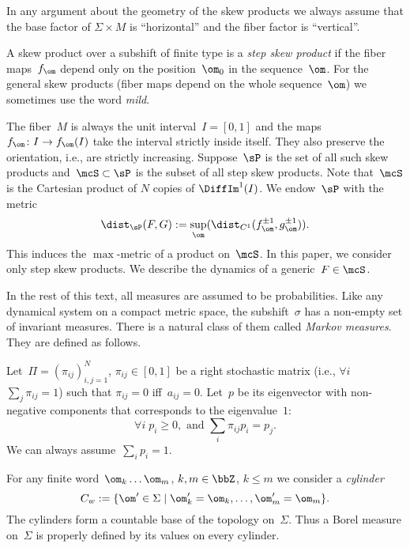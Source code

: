 \documentclass[a4paper,12pt]{amsart}
\begin{document}
In any argument about the geometry of the skew products we always assume that the base factor of $\Sigma \times M$ is ``horizontal'' and the fiber factor is ``vertical''.

\begin{Def} \label{d:step_and_mild}
A skew product over a subshift of finite type is a \emph{step skew product} if the fiber maps~$f_{\om}$ depend only on the position~$\om_0$ in the sequence~$\om$. For the general skew products (fiber maps depend on the whole sequence~$\om$) we sometimes use the word \emph{mild}.
\end{Def}

The fiber~$M$ is always the unit interval~$I = [0,1]$ and the maps $f_\om \colon I \to f_\om(I)$
take the interval strictly inside itself. They also preserve the orientation, i.e., are strictly increasing. Suppose~$\sP$ is the set of all such skew products and~$\mcS \subset \sP$ is the subset of all step skew products. Note that~$\mcS$ is the Cartesian product of $N$ copies of $\DiffIm^1(I)$. We endow~$\sP$ with the metric
$$
\dist_\sP (F,G) := \sup_\om (\dist_{C^1} (f_\om^{\pm 1}, g_\om^{\pm 1})).
$$
This induces the $\max$-metric of a product on~$\mcS$.
In this paper, we consider only step skew products. We describe the dynamics of a generic~$F \in \mcS$.

In the rest of this text, all measures are assumed to be probabilities.
Like any dynamical system on a compact metric space, the subshift~$\sigma$ has a non-empty set of invariant measures. There is a natural class of them called \emph{Markov measures}. They are defined as follows.

Let~$\Pi = (\pi_{ij})_{i,j = 1}^N$, $\pi_{ij} \in [0,1]$ be a right stochastic matrix (i.e., $\forall i$ $\sum_j \pi_{ij} = 1$) such that $\pi_{ij} = 0$ iff~$a_{ij} = 0$. Let~$p$ be its eigenvector with non-negative components that corresponds to the eigenvalue~$1$:
\begin{equation}    \label{e:vector_p}
\forall i \; p_i \ge 0, \text{ and } \sum_i \pi_{ij} p_i = p_j.
\end{equation}
We can always assume~$\sum_i p_i = 1$.

For any finite word~$\om_k \ldots \om_m$, $k,m \in \bbZ$, $k \le m$ we consider a \emph{cylinder}
$$
C_w := \{ \om' \in \Sigma \mid \om_k' = \om_k, \ldots, \om_m' = \om_m \}.
$$
The cylinders form a countable base of the topology on~$\Sigma$. Thus a Borel measure on~$\Sigma$ is properly defined by its values on every cylinder.
\end{document}
